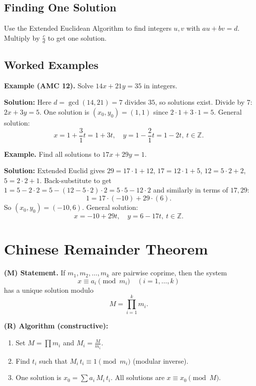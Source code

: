 \documentclass[12pt]{extarticle}
\begin{document}
\subsection*{Finding One Solution}
Use the Extended Euclidean Algorithm to find integers $u,v$ with $au+bv=d$. Multiply by $\tfrac{c}{d}$ to get one solution.

\subsection*{Worked Examples}

\begin{examplebox}
	\textbf{Example (AMC 12).} Solve $14x+21y=35$ in integers.
\end{examplebox}

	\textbf{Solution:}
Here $d=\gcd(14,21)=7$ divides $35$, so solutions exist. Divide by 7: $2x+3y=5$.
One solution is $(x_0,y_0)=(1,1)$ since $2\cdot1+3\cdot1=5$.
General solution:
\[
x=1+\frac{3}{1}t=1+3t,\quad y=1-\frac{2}{1}t=1-2t,\ t\in\mathbb{Z}.
\]

\begin{examplebox}
	\textbf{Example.} Find all solutions to $17x+29y=1$.
\end{examplebox}

	\textbf{Solution:}
Extended Euclid gives $29=17\cdot1+12$, $17=12\cdot1+5$, $12=5\cdot2+2$, $5=2\cdot2+1$.
Back-substitute to get $1=5-2\cdot2=5-(12-5\cdot2)\cdot2=5\cdot5-12\cdot2$ and similarly in terms of $17,29$:
\[
1=17\cdot(-10)+29\cdot(6).
\]
So $(x_0,y_0)=(-10,6)$. General solution:
\[
x=-10+29t,\quad y=6-17t,\ t\in\mathbb{Z}.
\]

\section{Chinese Remainder Theorem}

	\textbf{(M) Statement.} If $m_1,m_2,\dots,m_k$ are pairwise coprime, then the system
\[
x\equiv a_i \pmod{m_i}\quad(i=1,\dots,k)
\]
has a unique solution modulo
\[
M=\prod_{i=1}^k m_i.
\]

	\textbf{(R) Algorithm (constructive):}
\begin{enumerate}
\item Set $M=\prod m_i$ and $M_i=\frac{M}{m_i}$.
\item Find $t_i$ such that $M_i\,t_i\equiv 1\pmod{m_i}$ (modular inverse).
\item One solution is $x_0=\sum a_i\,M_i\,t_i$. All solutions are $x\equiv x_0\pmod M$.
\end{enumerate}
\end{document}
